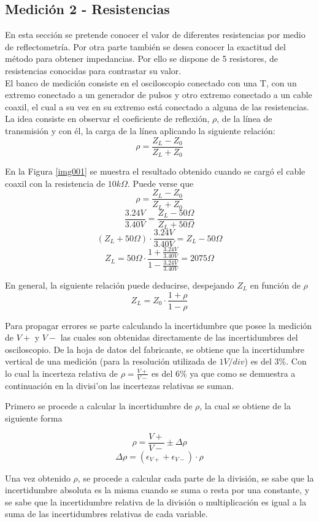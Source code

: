 \documentclass[a4paper,10pt]{article}
\begin{document}
	\subsection{Medición 2 - Resistencias}
	\indent En esta sección se pretende conocer el valor de diferentes 
	resistencias por medio de reflectometr\'ia. Por otra parte tambi\'en se 
	desea conocer la exactitud del m\'etodo para obtener impedancias. Por ello
	se dispone de 5 resistores, de resistencias conocidas para contrastar su 
	valor. \\
	\indent El banco de medición consiste en el osciloscopio conectado con una
	T, con un extremo conectado a un generador de pulsos y otro extremo 
	conectado a un cable coaxil, el cual a su vez en su extremo est\'a 
	conectado a alguna de las resistencias. La idea consiste en observar el 
	coeficiente de reflexión, $\rho$, de la l\'inea de transmisión y con \'el,
	la carga de la l\'inea aplicando la siguiente relaci\'on: 
	$$\rho=\frac{Z_L-Z_0}{Z_L+Z_0}$$
	
	\indent En la Figura \ref{img001} se muestra el resultado obtenido cuando 
	se carg\'o el cable coaxil con la resistencia de $10k\Omega$. Puede verse 
	que $$\rho=\frac{Z_L-Z_0}{Z_L+Z_0}$$
	$$\frac{3.24V}{3.40V}=\frac{Z_L- 50\Omega}{Z_L+50\Omega}$$
	$$(Z_L+50\Omega) \cdot \frac{3.24V}{3.40V}=Z_L- 50\Omega$$
	$$Z_L = 50\Omega\cdot\frac{1 + \frac{3.24V}{3.40V}}{1-\frac{3.24V}{3.40V}}
	= 2075\Omega$$
	
	\indent En general, la siguiente relaci\'on puede deducirse, despejando 
	$Z_L$ en funci\'on de $\rho$ 
	$$Z_L = Z_0\cdot\frac{1 + \rho}{1-\rho} $$

	\indent Para propagar errores se parte calculando la incertidumbre que 
	posee la medición de $V+$ y $V-$ las cuales son obtenidas directamente de 
	las incertidumbres del osciloscopio. De la hoja de datos del fabricante, 
	se obtiene que la incertidumbre vertical de una medici\'on (para la 
	resoluci\'on utilizada de $1V/div$) es del $3\%$. Con lo cual la incerteza
	relativa de $\rho=\frac{V+}{V-}$ es del $6\%$ ya que como se demuestra a 
	continuaci\'on en la divisi'on las incertezas relativas se suman.
	
	\indent Primero se procede a calcular la incertidumbre de $\rho$, la cual
	se obtiene de la siguiente forma
	
	$$\rho = \frac{V+}{V-} \pm \Delta\rho$$
	$$\Delta\rho = (\epsilon_{V+} + \epsilon_{V-})\cdot\rho$$

	\indent Una vez obtenido $\rho$, se procede a calcular cada parte de la 
	división, se sabe que la incertidumbre absoluta es la misma cuando se suma o
	resta por una constante, y se sabe que la incertidumbre relativa de la 
	división o multiplicación es igual a la suma de las incertidumbres relativas
	de cada variable.
\end{document}
